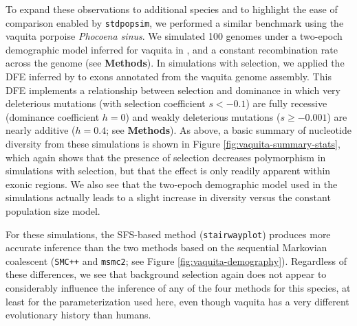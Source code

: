 \documentclass[hidelinks]{article}
\newcommand{\stdpopsim}{\texttt{stdpopsim}\xspace}
\newcommand{\msmc}{\texttt{msmc2}\xspace}
\newcommand{\stairway}{\texttt{stairwayplot}\xspace}
\newcommand{\gone}{\texttt{GONE}\xspace}
\newcommand{\smcpp}{\texttt{SMC++}\xspace}
\begin{document}
    To expand these observations to additional species and to highlight the ease of comparison enabled by \stdpopsim,
    we performed a similar benchmark using the vaquita porpoise \textit{Phocoena sinus}.
    We simulated 100 genomes under a two-epoch demographic model inferred for vaquita in \textcite{robinson2022critically},
    and a constant recombination rate across the genome (see \textbf{Methods}).
    In simulations with selection, we applied the DFE inferred by \textcite{robinson2022critically} to exons
    annotated from the vaquita genome assembly.
    This DFE implements a relationship between selection and dominance 
    in which very deleterious mutations (with selection coefficient $s<-0.1$) are fully recessive
    (dominance coefficient $h=0$) and weakly deleterious mutations ($s\geq -0.001$) are nearly
    additive ($h=0.4$; see \textbf{Methods}).
    As above, a basic summary of nucleotide diversity from these simulations is shown in Figure \ref{fig:vaquita-summary-stats},
    which again shows that the presence of selection decreases polymorphism in simulations with selection, but that the effect
    is only readily apparent within exonic regions.
    We also see that the two-epoch demographic model used in the simulations actually leads to a slight increase
    in diversity versus the constant population size model.
    
    For these simulations, the SFS-based method (\stairway) produces more accurate
    inference than the two methods based on the sequential Markovian coalescent 
    (\smcpp and \msmc; see Figure \ref{fig:vaquita-demography}).
    Regardless of these differences, we see that background selection again does not
    appear to considerably influence the inference of any of the four methods for this species,
    at least for the parameterization used here, 
    even though vaquita has a very different evolutionary history than humans.
    
    


%
\end{document}

